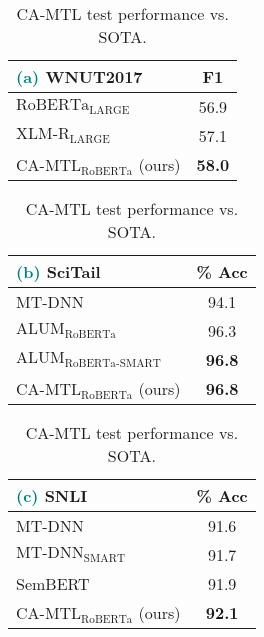 \documentclass{article} \usepackage{iclr2021_conference,times}
\begin{document}
\begin{table}[h]
    \caption{\small CA-MTL test performance vs. SOTA.}
    \begin{subtable}[h]{0.3\textwidth}
        \centering
        \footnotesize
        \setlength{\tabcolsep}{2pt}
        \begin{tabular}{|l|c|}
        	\hline 
        		\textcolor{teal}{\textbf{(a)}} \textbf{WNUT2017} & F1 \\
        		\hline
$\text{RoBERTa}_{\text{LARGE}}$         & 56.9 \\
                $\text{XLM-R}_{\text{LARGE}}$           & 57.1 \\
                \hline
                $\text{CA-MTL}_{\text{RoBERTa}}$ (ours)  & \textbf{58.0} \\
            \hline
        \end{tabular}
    \end{subtable}
    \hfill
    \begin{subtable}[h]{0.3\textwidth}
        \centering
        \footnotesize
        \setlength{\tabcolsep}{2pt}
        \begin{tabular}{|l|c|}
    	\hline
    	    \textcolor{teal}{\textbf{(b)}} \textbf{SciTail} & \% Acc \\
    	    \hline
             MT-DNN                                & 94.1           \\
$\text{ALUM}_{\text{RoBERTa}}$        & 96.3           \\
            $\text{ALUM}_{\text{RoBERTa-SMART}}$  &\textbf{96.8}   \\
        \hline
            $\text{CA-MTL}_{\text{RoBERTa}}$ (ours)     &\textbf{96.8}   \\
        \hline
    \end{tabular}

     \end{subtable}
     \hfill
    \begin{subtable}[h]{0.3\textwidth}
        \centering
        \footnotesize
        \setlength{\tabcolsep}{2pt}
        \begin{tabular}{|l|c|}
    	\hline 
        	\textcolor{teal}{\textbf{(c)}} \textbf{SNLI} & \% Acc \\
        	\hline
    		MT-DNN                                & 91.6 \\
            $\text{MT-DNN}_{\text{SMART}}$        & 91.7 \\
            SemBERT                               & 91.9 \\
            \hline
            $\text{CA-MTL}_{\text{RoBERTa}}$ (ours)     & \textbf{92.1} \\
        \hline
    \end{tabular}
     \end{subtable}
     
     \label{table:ner_scitail_snli}
\end{table}
\end{document}
